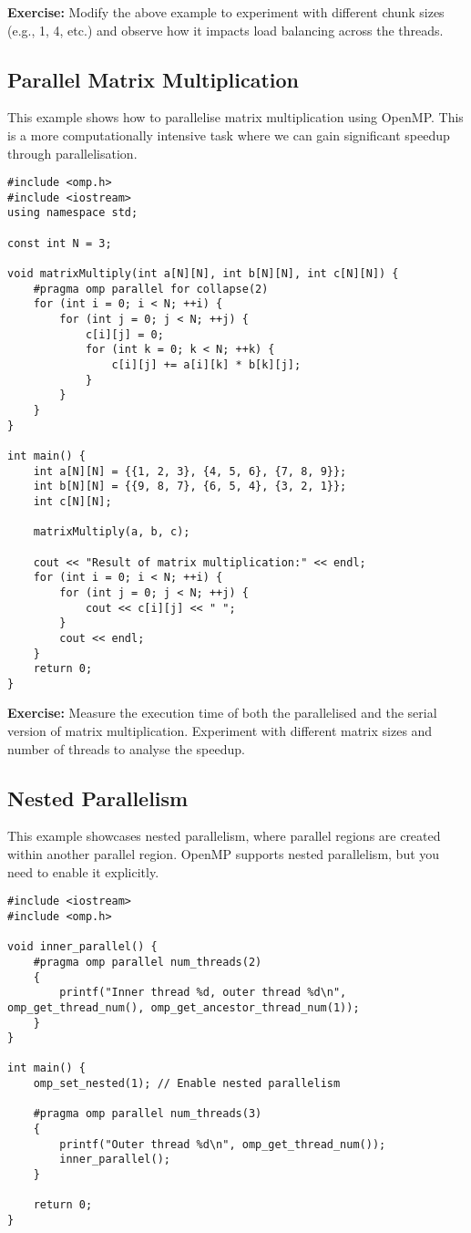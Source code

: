 \documentclass{article}
\begin{document}
\textbf{Exercise:} Modify the above example to experiment with different chunk sizes (e.g., 1, 4, etc.) and observe how it impacts load balancing across the threads.

\subsection*{Parallel Matrix Multiplication}
This example shows how to parallelise matrix multiplication using OpenMP. This is a more computationally intensive task where we can gain significant speedup through parallelisation.

\begin{verbatim}
#include <omp.h>
#include <iostream>
using namespace std;

const int N = 3;

void matrixMultiply(int a[N][N], int b[N][N], int c[N][N]) {
    #pragma omp parallel for collapse(2)
    for (int i = 0; i < N; ++i) {
        for (int j = 0; j < N; ++j) {
            c[i][j] = 0;
            for (int k = 0; k < N; ++k) {
                c[i][j] += a[i][k] * b[k][j];
            }
        }
    }
}

int main() {
    int a[N][N] = {{1, 2, 3}, {4, 5, 6}, {7, 8, 9}};
    int b[N][N] = {{9, 8, 7}, {6, 5, 4}, {3, 2, 1}};
    int c[N][N];

    matrixMultiply(a, b, c);

    cout << "Result of matrix multiplication:" << endl;
    for (int i = 0; i < N; ++i) {
        for (int j = 0; j < N; ++j) {
            cout << c[i][j] << " ";
        }
        cout << endl;
    }
    return 0;
}
\end{verbatim}

\textbf{Exercise:} Measure the execution time of both the parallelised and the serial version of matrix multiplication. Experiment with different matrix sizes and number of threads to analyse the speedup.

\subsection*{Nested Parallelism}
This example showcases nested parallelism, where parallel regions are created within another parallel region. OpenMP supports nested parallelism, but you need to enable it explicitly.

\begin{verbatim}
#include <iostream>
#include <omp.h>

void inner_parallel() {
    #pragma omp parallel num_threads(2)
    {
        printf("Inner thread %d, outer thread %d\n", omp_get_thread_num(), omp_get_ancestor_thread_num(1));
    }
}

int main() {
    omp_set_nested(1); // Enable nested parallelism

    #pragma omp parallel num_threads(3)
    {
        printf("Outer thread %d\n", omp_get_thread_num());
        inner_parallel();
    }

    return 0;
}
\end{verbatim}
\end{document}
